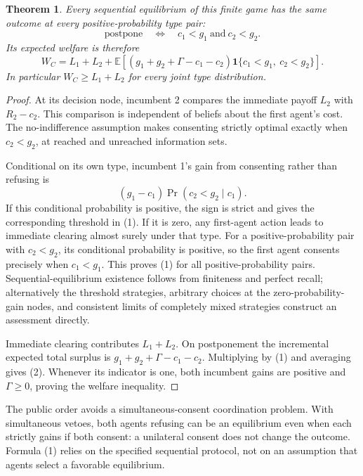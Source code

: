 \documentclass[11pt]{article}
\newtheorem{theorem}{Theorem}
\theoremstyle{definition}
\begin{document}
\begin{theorem}
Every sequential equilibrium of this finite game has the same outcome
at every positive-probability type pair:
\[
 \text{postpone}\quad\Longleftrightarrow\quad
 c_1<g_1\ \text{and}\ c_2<g_2.                          \tag{1}
\]
Its expected welfare is therefore
\[
 W_C=L_1+L_2+
 \mathbb E\left[
 (g_1+g_2+\Gamma-c_1-c_2)
 \mathbf1\{c_1<g_1,\ c_2<g_2\}\right].                \tag{2}
\]
In particular $W_C\ge L_1+L_2$ for every joint type distribution.
\end{theorem}
\begin{proof}
At its decision node, incumbent 2 compares the immediate payoff $L_2$
with $R_2-c_2$. This comparison is independent of beliefs about the first
agent's cost. The no-indifference assumption makes consenting strictly
optimal exactly when $c_2<g_2$, at reached and unreached information sets.

Conditional on its own type, incumbent 1's gain from consenting rather
than refusing is
\[
 (g_1-c_1)\Pr(c_2<g_2\mid c_1).                         \tag{3}
\]
If this conditional probability is positive, the sign is strict and gives
the corresponding threshold in (1). If it is zero, any first-agent action
leads to immediate clearing almost surely under that type. For a
positive-probability pair with $c_2<g_2$, its conditional probability is
positive, so the first agent consents precisely when $c_1<g_1$.
This proves (1) for all positive-probability pairs. Sequential-equilibrium
existence follows from finiteness and perfect recall; alternatively the
threshold strategies, arbitrary choices at the zero-probability-gain
nodes, and consistent limits of completely mixed strategies construct an
assessment directly.

Immediate clearing contributes $L_1+L_2$. On postponement the incremental
expected total surplus is $g_1+g_2+\Gamma-c_1-c_2$. Multiplying by (1)
and averaging gives (2). Whenever its indicator is one, both incumbent
gains are positive and $\Gamma\ge0$, proving the welfare inequality.
\end{proof}
The public order avoids a simultaneous-consent coordination problem.
With simultaneous vetoes, both agents refusing can be an equilibrium even
when each strictly gains if both consent: a unilateral consent does not
change the outcome. Formula (1) relies on the specified sequential
protocol, not on an assumption that agents select a favorable equilibrium.
\end{document}
